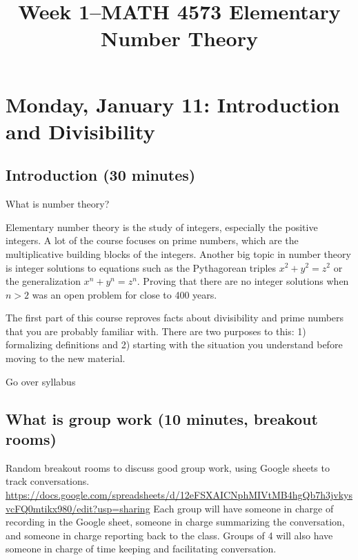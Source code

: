 \documentclass[letterpaper, 11 pt]{article}
\title{Week 1--MATH 4573 Elementary Number Theory}
\begin{document}
\maketitle
\tableofcontents
\section{Monday, January 11: Introduction and Divisibility}


\subsection{Introduction (30 minutes)}

What is number theory?

Elementary number theory is the study of integers, especially the positive integers. A lot of the course focuses on prime numbers, which are the multiplicative building blocks of the integers. Another big topic in number theory is integer solutions to equations such as the Pythagorean triples $x^2+y^2=z^2$ or the generalization $x^n+y^n=z^n$. Proving that there are no integer solutions when $n>2$ was an open problem for close to 400 years.

The first part of this course reproves facts about divisibility and prime numbers that you are probably familiar with. There are two purposes to this: 1) formalizing definitions and 2) starting with the situation you understand before moving to the new material.

Go over syllabus

\subsection{What is group work (10 minutes, breakout rooms)}

Random breakout rooms to discuss good group work, using Google
sheets to track conversations. \url{https://docs.google.com/spreadsheets/d/12eFSXAICNphMIVtMB4hgQb7h3jvkysvcFQ0mtikx980/edit?usp=sharing}
Each group will have someone in charge of recording in the Google sheet, someone in charge summarizing the conversation, and someone in charge reporting back to the class. Groups of 4 will also have someone in charge of time keeping and facilitating conversation.
\end{document}

